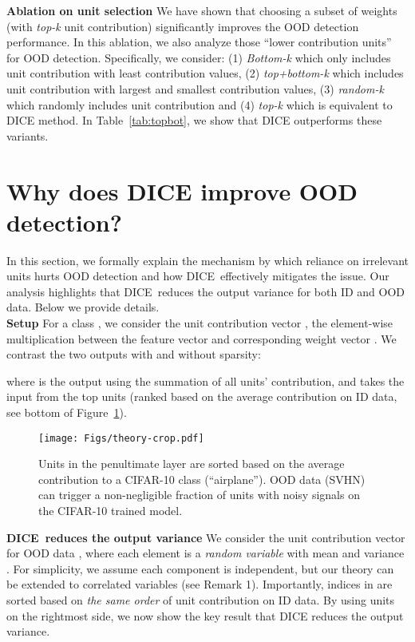 \documentclass[runningheads]{llncs}
\newcommand{\methodAbbr}{DICE~}
\begin{document}
\noindent \textbf{Ablation on unit selection}
We have shown that choosing a subset of weights (with \emph{top-k} unit contribution) significantly improves the OOD detection performance. In this ablation, we also analyze those ``lower contribution units'' for OOD detection. Specifically, we consider: (1) \emph{Bottom-k} which only includes  unit contribution with least contribution values, (2) \emph{top+bottom-k} which includes  unit contribution with largest and smallest contribution values, (3) \emph{random-k} which randomly includes  unit contribution and (4) \emph{top-k} which is equivalent to DICE method.  In Table~\ref{tab:topbot}, we show that DICE  outperforms these variants.





\section{Why does DICE improve OOD detection?}
\label{sec:theory}


In this section, we formally explain the mechanism by which reliance on irrelevant units hurts OOD detection and how \methodAbbr effectively mitigates the issue. Our analysis highlights that \methodAbbr reduces the output variance for both ID and OOD data. Below we provide details. \\

\noindent \textbf{Setup} For a class , we consider the unit contribution vector , the element-wise multiplication between the feature vector  and corresponding weight vector . 
We contrast the two outputs with and without sparsity:

where  is the output using the summation of all units' contribution, and  takes the input from the top units (ranked based on the average contribution on ID data, see bottom of Figure~\ref{fig:theory}). \\


\begin{figure}
    \centering
    \texttt{[image: Figs/theory-crop.pdf]}
   \caption{\small Units in the penultimate layer are sorted based on the average contribution to a CIFAR-10 class (``airplane''). OOD data (SVHN) can trigger a non-negligible fraction of units with noisy signals on the CIFAR-10 trained model. }
  \label{fig:theory}
\end{figure}

\noindent \textbf{\methodAbbr reduces the output variance} We consider the unit contribution vector for OOD data , where each element is a \emph{random variable}  with  mean  and variance .
For simplicity, we assume each component is independent, but our theory can be extended to correlated variables (see Remark 1). 
Importantly, {indices in  are sorted based on \emph{the same order} of unit contribution on ID data}. By using units on the rightmost side, we now show the key result that DICE reduces the output variance.
\end{document}
